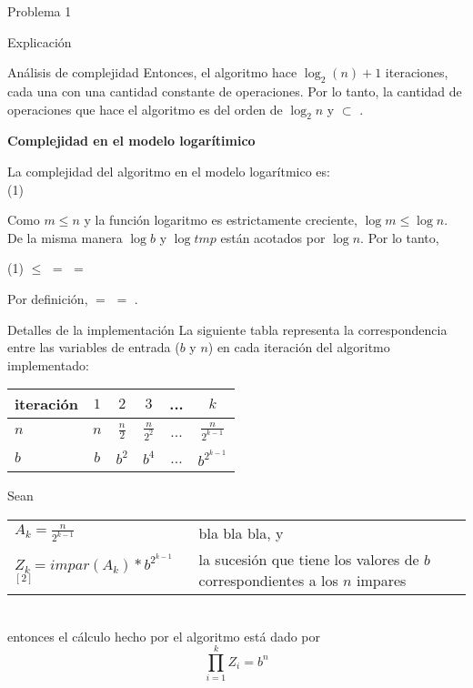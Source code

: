 \begin{section}{Problema 1}
\begin{subsection}{Explicación}
\begin{subsubsection}{Análisis de complejidad}
		Entonces, el algoritmo hace $\log_2(n)+1$ iteraciones, cada una con una cantidad constante de operaciones. 
		Por lo tanto, la cantidad de operaciones que hace el algoritmo es del orden de $\log_2 n$ y  $\subset$ .

		\vspace{0.5cm}
		\noindent\textbf{Complejidad en el modelo logarítimico}

			La complejidad del algoritmo en el modelo logarítmico es: \\
(1) 

			Como $m\leq n$ y la función logaritmo es estrictamente creciente, $\log m \leq \log n$. De la misma manera $\log b$ y $\log tmp$ están acotados por $\log n$. Por lo tanto,

(1) $\leq$  $=$  $=$ 

		Por definición,  $=$  $=$ .

		\end{subsubsection}
	\end{subsection}

	\begin{subsection}{Detalles de la implementación}
		La siguiente tabla representa la correspondencia entre las variables de entrada ($b$ y $n$) en cada iteración del algoritmo implementado:

		\vspace{0.5cm}
		\begin{center}
		\begin{tabular}{|l|c|c|c|c|c|}
			\hline
			iteración   & $1$ & $2$           & $3$             & ... & $k$ \\
			\hline
			$n$         & $n$ & $\frac{n}{2}$ & $\frac{n}{2^2}$ & ... & $\frac{n}{2^{k-1}}$ \\
			\hline
			$b$         & $b$ & $b^2$         & $b^4$           & ... & $b^{2^{k-1}}$ \\
			\hline
		\end{tabular}
		\end{center}

		\vspace{0.5cm}
		\noindent Sean \\
		\indent
		\begin{tabular}{ll}
			$A_k = \frac{n}{2^{k-1}}$ & bla bla bla, y \\
			$Z_k = impar(A_k) * b^{2^{k-1}}$ $^{[2]}$ & la sucesión que tiene los valores de $b$ correspondientes a los $n$ impares
		\end{tabular} \\
		\vspace{0.2cm}
		entonces el cálculo hecho por el algoritmo está dado por 
		$$\displaystyle\prod_{i=1}^k Z_i = b^n$$


\end{subsection}
\end{section}
